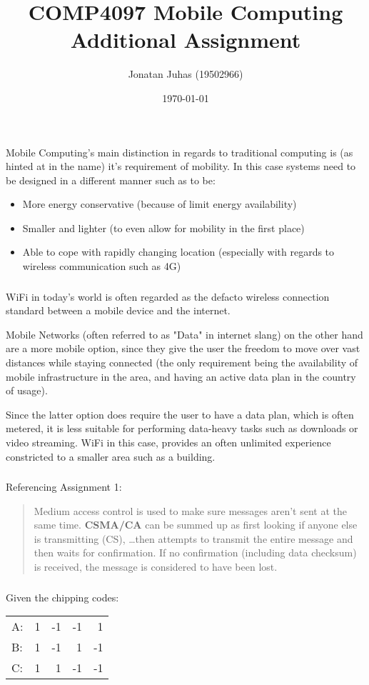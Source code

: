 \documentclass[12pt]{article}
\title{
    COMP4097 Mobile Computing \linebreak
    Additional Assignment
}
\author{Jonatan Juhas (19502966)}
\date{\today}
\newcommand{\multipartexercise}{\addtocounter{subsection}{1}\setcounter{subsubsection}{0}}
\newcommand{\exercisepart}{\subsubsection{}}
\begin{document}
\maketitle

\multipartexercise
\exercisepart
Mobile Computing's main distinction in regards to traditional computing is (as hinted at in the name) it's requirement of mobility. In this case systems need to be designed in a different manner such as to be:

\begin{itemize}
  \item More energy conservative (because of limit energy availability)
  \item Smaller and lighter (to even allow for mobility in the first place)
  \item Able to cope with rapidly changing location (especially with regards to wireless communication such as 4G)
\end{itemize}

\exercisepart
WiFi in today's world is often regarded as the defacto wireless connection standard between a mobile device and the internet.

Mobile Networks (often referred to as "Data" in internet slang) on the other hand are a more mobile option, since they give the user the freedom to move over vast distances while staying connected (the only requirement being the availability of mobile infrastructure in the area, and having an active data plan in the country of usage).

Since the latter option does require the user to have a data plan, which is often metered, it is less suitable for performing data-heavy tasks such as downloads or video streaming. WiFi in this case, provides an often unlimited experience constricted to a smaller area such as a building.

\exercisepart
Referencing Assignment 1:
\begin{quote}
  Medium access control is used to make sure messages aren't sent at the same time. \textbf{CSMA/CA} can be summed up as first looking if anyone else is transmitting (CS), \dots then attempts to transmit the entire message and then waits for confirmation. If no confirmation (including data checksum) is received, the message is considered to have been lost.
\end{quote}

\multipartexercise
\exercisepart
Given the chipping codes:\\
\begin{tabular}{lrrrr}
A:&1&-1&-1&1\\
B:&1&-1&1&-1\\
C:&1&1&-1&-1\\
\end{tabular}
\end{document}
